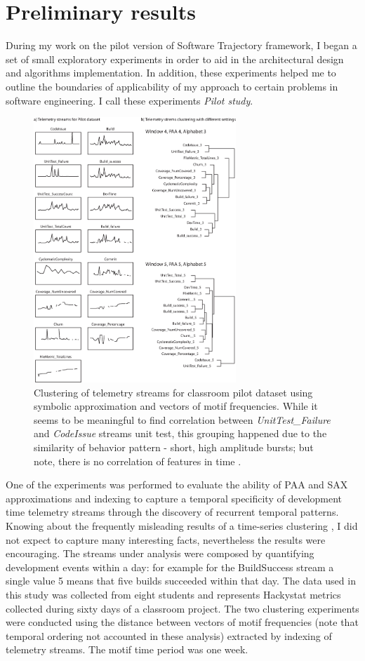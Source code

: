 \documentclass{sig-alternate}
\begin{document}
\section{Preliminary results}
During my work on the pilot version of Software Trajectory framework, I began a set of small exploratory experiments in order to aid in the architectural design and algorithms implementation. In addition, these experiments helped me to outline the boundaries of applicability of my approach to certain problems in software engineering. I call these experiments \textit{Pilot study}.

\begin{figure}[tbp]
   \centering
   \includegraphics[height=100mm]{cluster_streams.eps}
   \caption{Clustering of telemetry streams for classroom pilot dataset using symbolic approximation and vectors of motif frequencies. While it seems to be meaningful to find correlation between \textit{UnitTest\_Failure} and \textit{CodeIssue} streams unit test, this grouping happened due to the similarity of behavior pattern - short, high amplitude bursts; but note, there is no correlation of features in time .}
   \label{fig:cluster_streams}
\end{figure}

One of the experiments was performed to evaluate the ability of PAA and SAX approximations and indexing to capture a temporal specificity of development time telemetry streams through the discovery of recurrent temporal patterns. Knowing about the frequently misleading results of a time-series clustering \cite{citeulike:227029}, I did not expect to capture many interesting facts, nevertheless the results were encouraging. The streams under analysis were composed by quantifying development events within a day: for example for the BuildSuccess stream a single value 5 means that five builds succeeded within that day. The data used in this study was collected from eight students and represents Hackystat metrics collected during sixty days of a classroom project. The two clustering experiments were conducted using the distance between vectors of motif frequencies (note that temporal ordering not accounted in these analysis) extracted by indexing of telemetry streams. The motif time period was one week.
\end{document}
